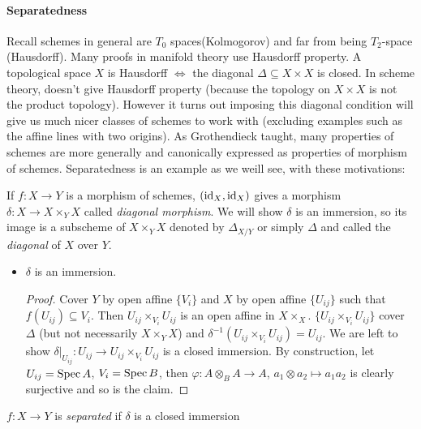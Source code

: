 \documentclass[main]{subfiles}
\begin{document}
\paragraph{Separatedness} Recall schemes in general are $T_0$ spaces(Kolmogorov) and far from being $T_2$-space (Hausdorff). Many proofs in manifold theory use Hausdorff property. A topological space $X$ is Hausdorff $\iff$ the diagonal $\Delta\subseteq X\times X$ is closed. In scheme theory, doesn't give Hausdorff property (because the topology on $X\times X$ is not the product topology). However it turns out imposing this diagonal condition will give us much nicer classes of schemes to work with (excluding examples such as the affine lines with two origins). As Grothendieck taught, many properties of schemes are more generally and canonically expressed as properties of morphism of schemes. Separatedness is an example as we weill see, with these motivations:

\begin{definition}
If $f:X\to Y$ is a morphism of schemes, $(\operatorname{id}_X,\operatorname{id}_X)$ gives a morphism $\delta:X\to X\times_YX$ called \textit{diagonal morphism}. We will show $\delta$ is an immersion, so its image is a subscheme of $X\times_YX$ denoted by $\Delta_{X/Y}$ or simply $\Delta$ and called the \textit{diagonal} of $X$ over $Y$.
\end{definition}

\begin{itemize}
\item $\delta$ is an immersion.
\begin{proof}
Cover $Y$ by open affine $\{V_i\}$ and $X$ by open affine $\{U_{ij}\}$ such that $f(U_{ij})\subseteq V_i$. Then $U_{ij}\times_{V_i}U_{ij}$ is an open affine in $X\times _X$. $\{U_{ij}\times_{V_i}U_{ij}\}$ cover $\Delta$ (but not necessarily $X\times_YX$) and $\delta^{-1}(U_{ij}\times_{V_i}U_{ij})=U_{ij}$. We are left to show $\delta|_{U_{ij}}:U_{ij}\to U_{ij}\times_{V_i}U_{ij}$ is a closed immersion. By construction, let $U_{ij}=\operatorname{Spec} A$, $V_i=\operatorname{Spec} B$, then $\varphi:A\otimes_BA\to A$, $a_1\otimes a_2\mapsto a_1a_2$ is clearly surjective and so is the claim.
\end{proof}
\end{itemize}

\begin{definition}
$f:X\to Y$ is \textit{separated} if $\delta$ is a closed immersion
\end{definition}
\end{document}
